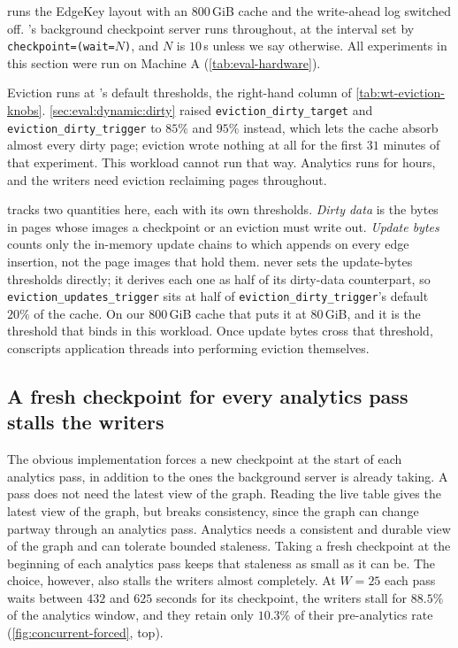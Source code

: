 \project{} runs the EdgeKey layout with an $800$\,GiB cache and the write-ahead log switched off.
\wt{}'s background checkpoint server runs throughout, at the interval set by \texttt{checkpoint=(wait=$N$)}, and $N$ is $10$\,s unless we say otherwise.
All experiments in this section were run on Machine A (\autoref{tab:eval-hardware}).

Eviction runs at \wt{}'s default thresholds, the right-hand column of \autoref{tab:wt-eviction-knobs}.
\autoref{sec:eval:dynamic:dirty} raised \texttt{eviction\_dirty\_target} and \texttt{eviction\_dirty\_trigger} to $85\%$ and $95\%$ instead, which lets the cache absorb almost every dirty page; eviction wrote nothing at all for the first $31$ minutes of that experiment.
This workload cannot run that way.
Analytics runs for hours, and the writers need eviction reclaiming pages throughout.

\wt{} tracks two quantities here, each with its own thresholds.
\emph{Dirty data} is the bytes in pages whose images a checkpoint or an eviction must write out.
\emph{Update bytes} counts only the in-memory update chains to which \project{} appends on every edge insertion, not the page images that hold them.
\wt{} never sets the update-bytes thresholds directly; it derives each one as half of its dirty-data counterpart, so \texttt{eviction\_updates\_trigger} sits at half of \texttt{eviction\_dirty\_trigger}'s default $20\%$ of the cache.
On our $800$\,GiB cache that puts it at $80$\,GiB, and it is the threshold that binds in this workload.
Once update bytes cross that threshold, \wt{} conscripts application threads into performing eviction themselves.

\subsection{A fresh checkpoint for every analytics pass stalls the writers}
\label{sec:eval:dynamic:concurrent:forced}

The obvious implementation forces a new checkpoint at the start of each analytics pass, in addition to the ones the background server is already taking.
A pass does not need the latest view of the graph.
Reading the live table gives the latest view of the graph, but breaks consistency, since the graph can change partway through an analytics pass.
Analytics needs a consistent and durable view of the graph and can tolerate bounded staleness.
Taking a fresh checkpoint at the beginning of each analytics pass keeps that staleness as small as it can be.
The choice, however, also stalls the writers almost completely.
At $W=25$ each pass waits between $432$ and $625$ seconds for its checkpoint, the writers stall for $88.5\%$ of the analytics window, and they retain only $10.3\%$ of their pre-analytics rate (\autoref{fig:concurrent-forced}, top).


